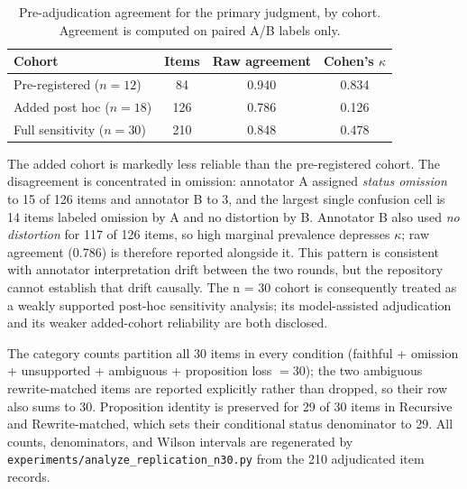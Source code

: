 \documentclass{ecai}
\begin{document}
\begin{table}[h]
\centering
\small
\begin{tabular}{lccc}
\toprule
Cohort & Items & Raw agreement & Cohen's $\kappa$ \\
\midrule
Pre-registered ($n=12$) & 84 & 0.940 & 0.834 \\
Added post hoc ($n=18$) & 126 & 0.786 & 0.126 \\
Full sensitivity ($n=30$) & 210 & 0.848 & 0.478 \\
\bottomrule
\end{tabular}
\caption{Pre-adjudication agreement for the primary judgment, by cohort.
Agreement is computed on paired A/B labels only.}
\label{tab:reliability}
\end{table}

The added cohort is markedly less reliable than the pre-registered cohort. The
disagreement is concentrated in omission: annotator A assigned
\emph{status omission} to 15 of 126 items and annotator B to 3, and the largest
single confusion cell is 14 items labeled omission by A and no distortion by B.
Annotator B also used \emph{no distortion} for 117 of 126 items, so high
marginal prevalence depresses $\kappa$; raw agreement (0.786) is therefore
reported alongside it. This pattern is consistent with annotator
interpretation drift between the two rounds, but the repository cannot
establish that drift causally. The n = 30 cohort is consequently treated as a
weakly supported post-hoc sensitivity analysis; its model-assisted
adjudication and its weaker added-cohort reliability are both disclosed.

The category counts partition all 30 items in every condition
(faithful + omission + unsupported + ambiguous + proposition loss $= 30$); the
two ambiguous rewrite-matched items are reported explicitly rather than
dropped, so their row also sums to 30. Proposition identity is preserved for 29
of 30 items in Recursive and Rewrite-matched, which sets their conditional
status denominator to 29. All counts, denominators, and Wilson intervals are
regenerated by \texttt{experiments/analyze\_replication\_n30.py} from the 210
adjudicated item records.
\end{document}
